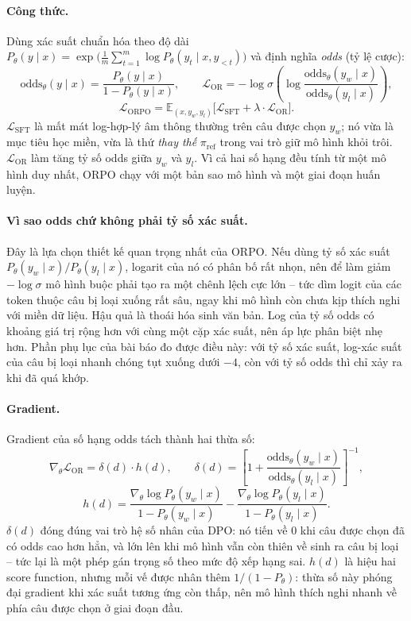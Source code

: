 \paragraph{Công thức.} Dùng xác suất chuẩn hóa theo độ dài \( P_\theta(y\mid x) = \exp\big(\frac{1}{m}\sum_{t=1}^{m}\log P_\theta(y_t\mid x, y_{<t})\big) \) và định nghĩa \emph{odds} (tỷ lệ cược):
\[
\text{odds}_\theta(y\mid x) = \frac{P_\theta(y\mid x)}{1 - P_\theta(y\mid x)}, \qquad
\mathcal{L}_{\text{OR}} = -\log\sigma\left(\log\frac{\text{odds}_\theta(y_w\mid x)}{\text{odds}_\theta(y_l\mid x)}\right),
\]
\[
\mathcal{L}_{\text{ORPO}} = \mathbb{E}_{(x, y_w, y_l)}\big[\mathcal{L}_{\text{SFT}} + \lambda\cdot\mathcal{L}_{\text{OR}}\big].
\]
\( \mathcal{L}_{\text{SFT}} \) là mất mát log-hợp-lý âm thông thường trên câu được chọn \( y_w \); nó vừa là mục tiêu học miền, vừa là thứ \emph{thay thế} \( \pi_{\text{ref}} \) trong vai trò giữ mô hình khỏi trôi. \( \mathcal{L}_{\text{OR}} \) làm tăng tỷ số odds giữa \( y_w \) và \( y_l \). Vì cả hai số hạng đều tính từ một mô hình duy nhất, ORPO chạy với một bản sao mô hình và một giai đoạn huấn luyện.

\paragraph{Vì sao odds chứ không phải tỷ số xác suất.} Đây là lựa chọn thiết kế quan trọng nhất của ORPO. Nếu dùng tỷ số xác suất \( P_\theta(y_w\mid x)/P_\theta(y_l\mid x) \), logarit của nó có phân bố rất nhọn, nên để làm giảm \( -\log\sigma \) mô hình buộc phải tạo ra một chênh lệch cực lớn -- tức dìm logit của các token thuộc câu bị loại xuống rất sâu, ngay khi mô hình còn chưa kịp thích nghi với miền dữ liệu. Hậu quả là thoái hóa sinh văn bản. Log của tỷ số odds có khoảng giá trị rộng hơn với cùng một cặp xác suất, nên áp lực phân biệt nhẹ hơn. Phần phụ lục của bài báo đo được điều này: với tỷ số xác suất, log-xác suất của câu bị loại nhanh chóng tụt xuống dưới \( -4 \), còn với tỷ số odds thì chỉ xảy ra khi đã quá khớp.

\paragraph{Gradient.} Gradient của số hạng odds tách thành hai thừa số:
\[
    \nabla_\theta \mathcal{L}_{\text{OR}} = \delta(d) \cdot h(d),
    \qquad
    \delta(d) = \left[ 1 + \frac{\text{odds}_\theta(y_w \mid x)}{\text{odds}_\theta(y_l \mid x)} \right]^{-1},
\]
\[
    h(d) = \frac{\nabla_\theta \log P_\theta(y_w \mid x)}{1 - P_\theta(y_w \mid x)}
         - \frac{\nabla_\theta \log P_\theta(y_l \mid x)}{1 - P_\theta(y_l \mid x)} .
\]
\( \delta(d) \) đóng đúng vai trò hệ số nhân của DPO: nó tiến về 0 khi câu được chọn đã có odds cao hơn hẳn, và lớn lên khi mô hình vẫn còn thiên về sinh ra câu bị loại -- tức lại là một phép gán trọng số theo mức độ xếp hạng sai. \( h(d) \) là hiệu hai score function, nhưng mỗi vế được nhân thêm \( 1/(1-P_\theta) \): thừa số này phóng đại gradient khi xác suất tương ứng còn thấp, nên mô hình thích nghi nhanh về phía câu được chọn ở giai đoạn đầu.

